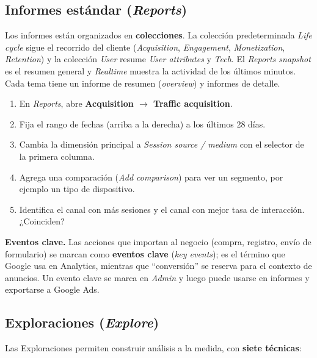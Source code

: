 \documentclass[11pt,letterpaper]{article}
\begin{document}
\subsection{Informes estándar (\emph{Reports})}

Los informes están organizados en \textbf{colecciones}. La colección predeterminada \emph{Life cycle} sigue el recorrido del cliente (\emph{Acquisition}, \emph{Engagement},
\emph{Monetization}, \emph{Retention}) y la colección \emph{User} resume \emph{User attributes} y \emph{Tech}. El \emph{Reports snapshot} es el resumen general y
\emph{Realtime} muestra la actividad de los últimos minutos. Cada tema tiene un informe de resumen (\emph{overview}) y informes de detalle.

\begin{cajaPasos}[title={Práctica: ¿de dónde llega el tráfico?}]
\begin{enumerate}[nosep,label=\arabic*.]
  \item En \emph{Reports}, abre \textbf{Acquisition $\rightarrow$ Traffic acquisition}.
  \item Fija el rango de fechas (arriba a la derecha) a los últimos 28 días.
  \item Cambia la dimensión principal a \emph{Session source / medium} con el selector de la primera columna.
  \item Agrega una comparación (\emph{Add comparison}) para ver un segmento, por ejemplo un tipo de dispositivo.
  \item Identifica el canal con más sesiones y el canal con mejor tasa de interacción. ¿Coinciden?
\end{enumerate}
\end{cajaPasos}

\textbf{Eventos clave.} Las acciones que importan al negocio (compra, registro, envío de formulario) se marcan como \textbf{eventos clave} (\emph{key events}); es el
término que Google usa en Analytics, mientras que \enquote{conversión} se reserva para el contexto de anuncios. Un evento clave se marca en \emph{Admin} y luego puede
usarse en informes y exportarse a Google Ads.

\subsection{Exploraciones (\emph{Explore})}

Las Exploraciones permiten construir análisis a la medida, con \textbf{siete técnicas}:
\end{document}
